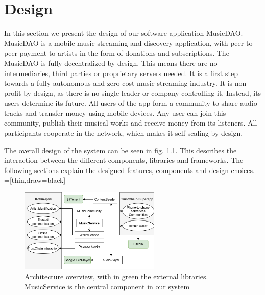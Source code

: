 \chapter{Design}
In this section we present the design of our software application MusicDAO. MusicDAO is a mobile music streaming and discovery application, with peer-to-peer payment to artists in the form of donations and subscriptions. The MusicDAO is fully decentralized by design. This means there are no intermediaries, third parties or proprietary servers needed. It is a first step towards a fully autonomous and zero-cost music streaming industry. It is non-profit by design, as there is no single leader or company controlling it. Instead, its users determine its future. All users of the app form a community to share audio tracks and transfer money using mobile devices. Any user can join this community, publish their musical works and receive money from its listeners. All participants cooperate in the network, which makes it self-scaling by design.

The overall design of the system can be seen in fig. \ref{fig:architecture}. This describes the interaction between the different components, libraries and frameworks. The following sections explain the designed features, components and design choices.
\\

=[thin,draw=black]

\begin{figure}
    \includegraphics[width=0.6\textwidth]{design/architecture-v1.png}
    \caption{Architecture overview, with in green the external libraries. MusicService is the central component in our system}
    \label{fig:architecture}
\end{figure}

